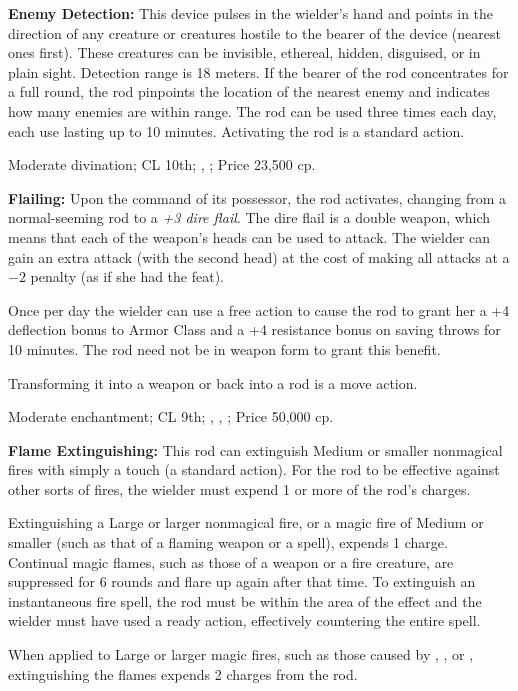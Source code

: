 \textbf{Enemy Detection:} This device pulses in the wielder's hand and points in the direction of any creature or creatures hostile to the bearer of the device (nearest ones first). These creatures can be invisible, ethereal, hidden, disguised, or in plain sight. Detection range is 18 meters. If the bearer of the rod concentrates for a full round, the rod pinpoints the location of the nearest enemy and indicates how many enemies are within range. The rod can be used three times each day, each use lasting up to 10 minutes. Activating the rod is a standard action.

Moderate divination; CL 10th; , ; Price 23,500 cp.

\textbf{Flailing:} Upon the command of its possessor, the rod activates, changing from a normal-seeming rod to a \emph{+3 dire flail}. The dire flail is a double weapon, which means that each of the weapon's heads can be used to attack. The wielder can gain an extra attack (with the second head) at the cost of making all attacks at a $-2$ penalty (as if she had the  feat).

Once per day the wielder can use a free action to cause the rod to grant her a +4 deflection bonus to Armor Class and a +4 resistance bonus on saving throws for 10 minutes. The rod need not be in weapon form to grant this benefit.

Transforming it into a weapon or back into a rod is a move action.

Moderate enchantment; CL 9th; , , ; Price 50,000 cp.

\textbf{Flame Extinguishing:} This rod can extinguish Medium or smaller nonmagical fires with simply a touch (a standard action). For the rod to be effective against other sorts of fires, the wielder must expend 1 or more of the rod's charges.

Extinguishing a Large or larger nonmagical fire, or a magic fire of Medium or smaller (such as that of a flaming weapon or a  spell), expends 1 charge. Continual magic flames, such as those of a weapon or a fire creature, are suppressed for 6 rounds and flare up again after that time. To extinguish an instantaneous fire spell, the rod must be within the area of the effect and the wielder must have used a ready action, effectively countering the entire spell.

When applied to Large or larger magic fires, such as those caused by , , or , extinguishing the flames expends 2 charges from the rod.

